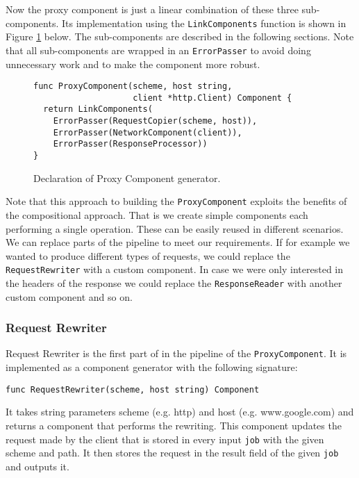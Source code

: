 Now the proxy component is just a linear combination of these three
sub-components. Its implementation using the \texttt{LinkComponents}
function is shown in Figure \ref{fig:ProxyComp} below. 
The sub-components are described in the
following sections. Note that all sub-components are wrapped
in an \texttt{ErrorPasser} to avoid doing unnecessary work 
and to make the component more robust.

\begin{figure}[h]
\centering
\begin{lstlisting}
func ProxyComponent(scheme, host string, 
                    client *http.Client) Component {
  return LinkComponents(
    ErrorPasser(RequestCopier(scheme, host)),
    ErrorPasser(NetworkComponent(client)),
    ErrorPasser(ResponseProcessor))
}
\end{lstlisting}
\caption[scale=1.0]{Declaration of Proxy Component generator.}
\label{fig:ProxyComp}
\end{figure}

Note that this approach to building the \texttt{ProxyComponent} exploits
the benefits of the compositional approach. That is we create simple
components each performing a single operation. These can be easily
reused in different scenarios. We can replace parts of the pipeline 
to meet our requirements. If for example we wanted to produce different
types of requests, we could replace the \texttt{RequestRewriter} with
a custom component. In case we were only interested in the headers of
the response we could replace the \texttt{ResponseReader} with another 
custom component and so on.

\subsubsection{Request Rewriter}
Request Rewriter is the first part of in the pipeline of the 
\texttt{ProxyComponent}. It is implemented as a component generator with the 
following signature:
\begin{lstlisting}
func RequestRewriter(scheme, host string) Component
\end{lstlisting}
It takes string parameters scheme (e.g. http) and host (e.g. www.google.com) 
and returns a component that performs the rewriting. This component
updates the request made by the client that is stored in every input 
\texttt{job} with the given scheme and path. It then stores the 
request in the result field of the given \texttt{job} and outputs it.


